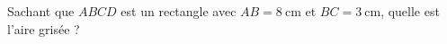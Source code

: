 
\begin{exercice}\label{exo2smath-0311}

    \begin{multicols}{2}
    Sachant que \( ABCD\) est un rectangle avec \( AB=\SI{8}{\centi\meter}\) et \( BC=\SI{3}{\centi\meter}\), quelle est l'aire grisée ?

    \columnbreak

    \begin{center}
        
    \end{center}
    \end{multicols}

\end{exercice}
